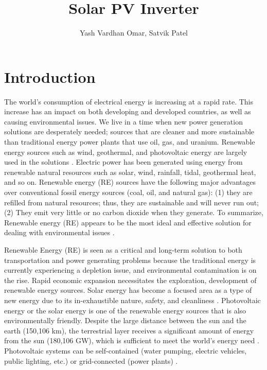 \documentclass[a4paper,12pt]{iitmdiss}
\title{Solar PV Inverter}
\author{Yash Vardhan Omar, Satvik Patel}
\begin{document}

\chapter{Introduction}\label{chap:intro}

The world's consumption of electrical energy is increasing at a rapid rate.
This increase has an impact on both developing and developed countries, as well as causing environmental issues. We live in a time when new power generation solutions are desperately needed; sources that are cleaner and more sustainable than traditional energy power plants that use oil, gas, and uranium. Renewable energy sources such as wind, geothermal, and photovoltaic energy are largely used in the solutions \textcolor{blue}{\cite{gammoudi2015stm}}. Electric power has been generated using energy from renewable natural resources such as solar, wind, rainfall, tidal, geothermal heat, and so on. Renewable energy (RE) sources have the following major advantages over conventional fossil energy sources (coal, oil, and natural gas): (1) they are refilled from natural resources; thus, they are sustainable and will never run out; (2) They emit very little or no carbon dioxide when they generate. To summarize, Renewable energy (RE) appears to be the most ideal and effective solution for dealing with environmental issues \textcolor{blue}{\cite{motahhir2018contribution}}.

Renewable Energy (RE) is seen as a critical and long-term solution to both transportation and power generating problems because the traditional energy is currently experiencing a depletion issue, and environmental contamination is on the rise. Rapid economic expansion necessitates the exploration, development of renewable energy sources. Solar energy has become a focused area as a type of new energy due to its in-exhaustible nature, safety, and cleanliness \textcolor{blue}{\cite{dengsheng2018research,cheddadi2018design}}. Photovoltaic energy or the solar energy is one of the renewable energy sources that is also environmentally friendly. Despite the large distance between the sun and the earth (150,106 km), the terrestrial layer receives a significant amount of energy from the sun (180,106 GW), which is sufficient to meet the world's energy need \textcolor{blue}{\cite{durgadevi2011study}}. Photovoltaic systems can be self-contained (water pumping, electric vehicles, public lighting, etc.) or grid-connected (power plants) \textcolor{blue}{\cite{gammoudi2015stm}}.
\end{document}
